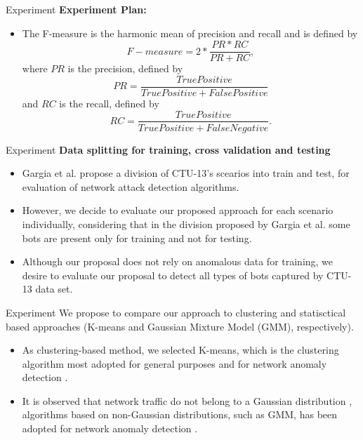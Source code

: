 \documentclass[newPxFont, numfooter, sectionpages]{beamer}
\begin{document}
\begin{frame}[c]{Experiment}
	\textbf{Experiment Plan:}
	\begin{itemize}
		\item The F-measure is the harmonic mean of precision and recall and is defined by 
		\begin{equation}\label{eq:eq10}
			F-measure = 2 * \frac{PR * RC}{PR + RC},				
		\end{equation}
		where $PR$ is the precision, defined by 
		\begin{equation}\label{eq:eq11}
			PR = \frac{True Positive}{True Positive + False Positive}
		\end{equation}
		and $RC$ is the recall, defined by 
		\begin{equation}\label{eq:eq12}
			RC = \frac{True Positive}{True Positive + False Negative}.
		\end{equation}
	\end{itemize}	
\end{frame}

\begin{frame}[c]{Experiment}
	\textbf{Data splitting for training, cross validation and testing}
	\begin{itemize}
		\item Gargia et al. \cite{garcia2014empirical} propose a division of CTU-13's scearios into train and test, for evaluation of network attack detection algorithms. 
		\item However, we decide to evaluate our proposed approach for each scenario individually, considering that in the division proposed by Gargia et al. some bots are present only for training and not for testing. 
		\item Although our proposal does not rely on anomalous data for training, we desire to evaluate our proposal to detect all types of bots captured by CTU-13 data set.
	\end{itemize}
\end{frame}

\begin{frame}[c]{Experiment}
	We propose to compare our approach to clustering and statisctical based approaches (K-means and Gaussian Mixture Model (GMM), respectively).
	\begin{itemize}
		\item As clustering-based method, we selected K-means, which is the clustering algorithm most adopted for general purposes and for network anomaly detection \cite{gaddam2007k,moustafa2019holistic}.
		\item It is observed that network traffic do not belong to a Gaussian distribution \cite{benson2010network,moustafa2019holistic}, algorithms based on non-Gaussian distributions, such as GMM, has been adopted for network anomaly detection \cite{moustafa2019holistic}.
	\end{itemize}
\end{frame}
\end{document}
